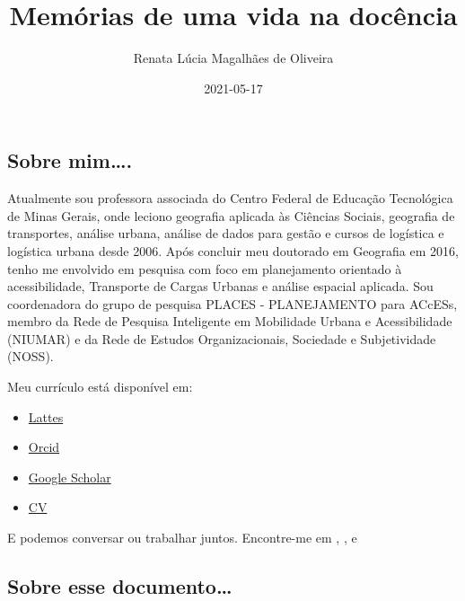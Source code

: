 \documentclass[
]{book}
\title{Memórias de uma vida na docência}
\author{Renata Lúcia Magalhães de Oliveira}
\date{2021-05-17}
\providecommand{\tightlist}{%
  \setlength{\itemsep}{0pt}\setlength{\parskip}{0pt}}
\begin{document}
\maketitle

{
\setcounter{tocdepth}{1}
\tableofcontents
}
\hypertarget{section}{%
\chapter*{}\label{section}}

\hypertarget{sobre-mim.}{%
\section*{Sobre mim\ldots.}\label{sobre-mim.}}


Atualmente sou professora associada do Centro Federal de Educação
Tecnológica de Minas Gerais, onde leciono geografia aplicada às Ciências
Sociais, geografia de transportes, análise urbana, análise de dados para
gestão e cursos de logística e logística urbana desde 2006. Após
concluir meu doutorado em Geografia em 2016, tenho me envolvido em
pesquisa com foco em planejamento orientado à acessibilidade, Transporte
de Cargas Urbanas e análise espacial aplicada. Sou coordenadora do grupo
de pesquisa PLACES - PLANEJAMENTO para ACcESs, membro da Rede de
Pesquisa Inteligente em Mobilidade Urbana e Acessibilidade (NIUMAR) e da
Rede de Estudos Organizacionais, Sociedade e Subjetividade (NOSS).

Meu currículo está disponível em:

\begin{itemize}
\tightlist
\item
  \href{http://lattes.cnpq.br/2642488704355833}{Lattes}
\item
  \href{https://orcid.org/0000-0002-9011-2342}{Orcid}
\item
  \href{https://scholar.google.com/citations?user=V6EX45EAAAAJ}{Google
  Scholar}
\item
  \href{https://github.com/retaoliveira/relements/raw/main/texto/index.pdf}{CV}
\end{itemize}

E podemos conversar ou trabalhar juntos. Encontre-me em
, ,
e

\hypertarget{sobre-esse-documento}{%
\section*{Sobre esse documento\ldots{}}\label{sobre-esse-documento}}
\end{document}

